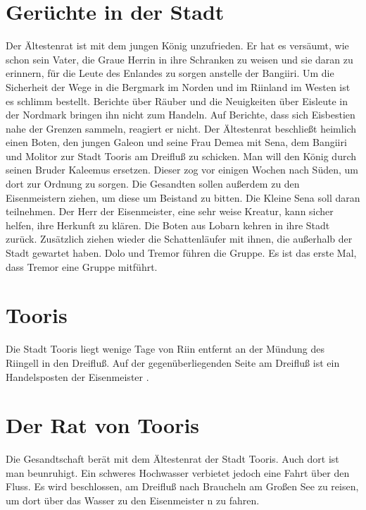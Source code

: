 \documentclass[12pt,a4paper,onecolumn,twoside,ngerman]{book}
\newcommand{\Molitor}{Molitor}
\newcommand{\Sena}{Sena}
\newcommand{\Bangiri}{Bangiiri}
\newcommand{\Enland}{Enland}
\newcommand{\Schattenlaufer}{Schattenläufer}
\newcommand{\Dolo}{Dolo}
\newcommand{\Tremor}{Tremor}
\newcommand{\Lobarn}{Lobarn}
\newcommand{\Nordmark}{Nordmark}
\newcommand{\Bergmark}{Bergmark}
\newcommand{\Eisleute}{Eisleute}
\newcommand{\Eisbestien}{Eisbestien}
\newcommand{\Rhinland}{Riinland}
\newcommand{\Rhingell}{Riingell}
\newcommand{\Rhin}{Riin}
\newcommand{\Kalemus}{Kaleemus}
\newcommand{\Galeon}{Galeon}
\newcommand{\Demea}{Demea}
\newcommand{\Dreifluss}{Dreifluß}
\newcommand{\Toris}{Tooris}
\newcommand{\Braucheln}{Braucheln}
\newcommand{\Eisenmeister}{Eisenmeister}
\begin{document}
{\section{Gerüchte in der Stadt}
Der Ältestenrat ist mit dem jungen König unzufrieden. Er hat es versäumt, wie schon sein Vater, die Graue Herrin in ihre Schranken zu weisen und sie daran zu erinnern, für die Leute des {\Enland}es zu sorgen anstelle der {\Bangiri}. Um die Sicherheit der Wege in die {\Bergmark} im Norden und im {\Rhinland} im Westen ist es schlimm bestellt. Berichte über Räuber und die Neuigkeiten über {\Eisleute} in der {\Nordmark} bringen ihn nicht zum Handeln. Auf Berichte, dass sich {\Eisbestien} nahe der Grenzen sammeln, reagiert er nicht.\linebreak
Der Ältestenrat beschließt heimlich einen Boten, den jungen {\Galeon} und seine Frau {\Demea} mit {\Sena}, dem {\Bangiri} und {\Molitor} zur Stadt {\Toris} am {\Dreifluss} zu schicken. Man will den König durch seinen Bruder {\Kalemus} ersetzen. Dieser zog vor einigen Wochen nach Süden, um dort zur Ordnung zu sorgen. Die Gesandten sollen außerdem zu den {\Eisenmeister}{n} ziehen, um diese um Beistand zu bitten. Die Kleine {\Sena} soll daran teilnehmen. Der Herr der {\Eisenmeister}, eine sehr weise Kreatur, kann sicher helfen, ihre Herkunft zu klären.\linebreak
Die Boten aus {\Lobarn} kehren in ihre Stadt zurück. Zusätzlich ziehen wieder die {\Schattenlaufer} mit ihnen, die außerhalb der Stadt gewartet haben. {\Dolo} und {\Tremor} führen die Gruppe. Es ist das erste Mal, dass {\Tremor} eine Gruppe mitführt.

\section{\Toris}
Die Stadt {\Toris} liegt wenige Tage von {\Rhin} entfernt an der Mündung des {\Rhingell} in den {\Dreifluss}. Auf der gegenüberliegenden Seite am {\Dreifluss} ist ein Handelsposten der {\Eisenmeister} .

\section{Der Rat von \Toris}
Die Gesandtschaft berät mit dem Ältestenrat der Stadt {\Toris}. Auch dort ist man beunruhigt. Ein schweres Hochwasser verbietet jedoch eine Fahrt über den Fluss. Es wird beschlossen, am {\Dreifluss} nach {\Braucheln} am Großen See zu reisen, um dort über das Wasser zu den {\Eisenmeister} n zu fahren.

}
\end{document}
